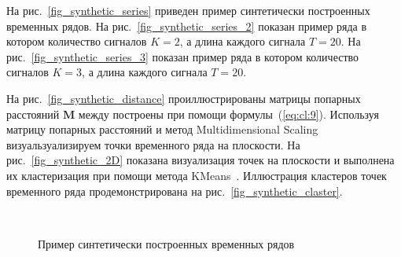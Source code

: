 \documentclass[12pt, twoside]{article}
\numberwithin{equation}{section}
\begin{document}
На рис.~\ref{fig_synthetic_series} приведен пример синтетически построенных временных рядов. На рис.~\ref{fig_synthetic_series_2} показан пример ряда в котором количество сигналов $K = 2$, а длина каждого сигнала $T = 20$. На рис.~\ref{fig_synthetic_series_3} показан пример ряда в котором количество сигналов $K = 3$, а длина каждого сигнала $T = 20$. 

На рис.~\ref{fig_synthetic_distance} проиллюстрированы матрицы попарных расстояний $\textbf{M}$ между построены при помощи формулы~(\ref{eq:cl:9}). Используя матрицу попарных расстояний и метод Multidimensional Scaling~\cite{Borg2005} визуальзуализируем точки временного ряда на плоскости. На рис.~\ref{fig_synthetic_2D} показана визуализация точек на плоскости и выполнена их кластеризация при помощи метода KMeans~\cite{Kanungo2000}. Иллюстрация кластеров точек временного ряда продемонстрирована на рис.~\ref{fig_synthetic_claster}.

\begin{figure}[h!t]\center
{}
\\
\caption{Пример синтетически построенных временных рядов}
\label{fig_real_series}
\end{figure}
\end{document}
